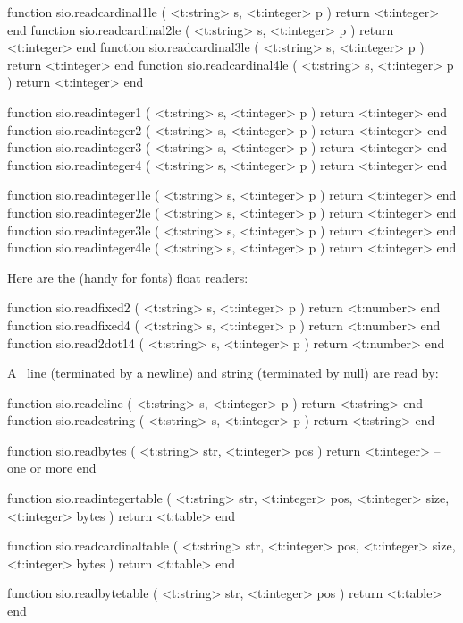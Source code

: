 function sio.readcardinal1le ( <t:string> s, <t:integer> p ) return <t:integer> end
function sio.readcardinal2le ( <t:string> s, <t:integer> p ) return <t:integer> end
function sio.readcardinal3le ( <t:string> s, <t:integer> p ) return <t:integer> end
function sio.readcardinal4le ( <t:string> s, <t:integer> p ) return <t:integer> end

function sio.readinteger1 ( <t:string> s, <t:integer> p ) return <t:integer> end
function sio.readinteger2 ( <t:string> s, <t:integer> p ) return <t:integer> end
function sio.readinteger3 ( <t:string> s, <t:integer> p ) return <t:integer> end
function sio.readinteger4 ( <t:string> s, <t:integer> p ) return <t:integer> end

function sio.readinteger1le ( <t:string> s, <t:integer> p ) return <t:integer> end
function sio.readinteger2le ( <t:string> s, <t:integer> p ) return <t:integer> end
function sio.readinteger3le ( <t:string> s, <t:integer> p ) return <t:integer> end
function sio.readinteger4le ( <t:string> s, <t:integer> p ) return <t:integer> end
\stoptyping

Here are the (handy for fonts) float readers:

\starttyping[option=LUA]
function sio.readfixed2 ( <t:string> s, <t:integer> p ) return <t:number> end
function sio.readfixed4 ( <t:string> s, <t:integer> p ) return <t:number> end
function sio.read2dot14 ( <t:string> s, <t:integer> p ) return <t:number> end
\stoptyping

A \CCODE\ line (terminated by a newline) and string (terminated by null) are read
by:

\starttyping[option=LUA]
function sio.readcline   ( <t:string> s, <t:integer> p ) return <t:string> end
function sio.readcstring ( <t:string> s, <t:integer> p ) return <t:string> end
\stoptyping

\starttyping[option=LUA]
function sio.readbytes (
    <t:string>  str,
    <t:integer> pos
)
    return <t:integer> -- one or more
end
\stoptyping

\starttyping[option=LUA]
function sio.readintegertable (
    <t:string>  str,
    <t:integer> pos,
    <t:integer> size,
    <t:integer> bytes
)
    return <t:table>
end

function sio.readcardinaltable (
    <t:string>  str,
    <t:integer> pos,
    <t:integer> size,
    <t:integer> bytes
)
    return <t:table>
end

function sio.readbytetable (
    <t:string>  str,
    <t:integer> pos
)
    return <t:table>
end
\stoptyping

